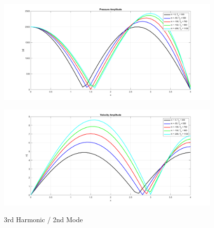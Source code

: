 \documentclass[8pt]{article} %
\begin{document}
\begin{figure}[H]
  \centering
  \begin{minipage}[b]{0.495\linewidth}
    \centering
    \includegraphics[width=\linewidth]{pvsx2}
    \label{fig:pvsx2}
  \end{minipage}
  \hfill
  \begin{minipage}[b]{0.495\linewidth}
    \centering
    \includegraphics[width=\linewidth]{vvsx2}
    \label{fig:vvsx2}
  \end{minipage}
\caption{3rd Harmonic / 2nd Mode}
\end{figure}
\end{document}
